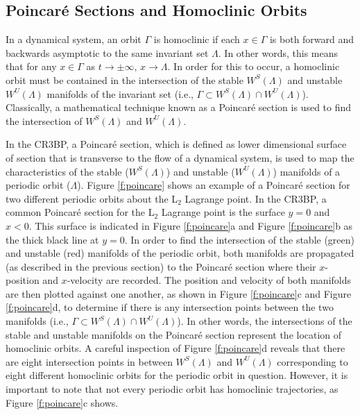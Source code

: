 \documentclass[11pt]{article} %
\begin{document}
\subsection{Poincar\'{e} Sections and Homoclinic Orbits}
In a dynamical system, an orbit $\Gamma$ is homoclinic if each $x\in\Gamma$ is both forward and backwards asymptotic to the same invariant set $\Lambda$. In other words, this means that for any $x\in\Gamma$ as $t\rightarrow\pm\infty$, $x\rightarrow\Lambda$. In order for this to occur, a homoclinic orbit must be contained in the intersection of the stable $W^S\left(\Lambda\right)$ and unstable $W^U\left(\Lambda\right)$ manifolds of the invariant set (i.e., $\Gamma\subset W^S\left(\Lambda\right)\cap W^U\left(\Lambda\right)$). Classically, a mathematical technique known as a Poincar\'{e} section is used to find the intersection of $W^S\left(\Lambda\right)$ and $W^U\left(\Lambda\right)$. 

In the CR3BP, a Poincar\'{e} section, which is defined as lower dimensional surface of section that is transverse to the flow of a dynamical system, is used to map the characteristics of the stable ($W^S\left(\Lambda\right)$) and unstable ($W^U\left(\Lambda\right)$) manifolds of a periodic orbit ($\Lambda$). Figure \ref{f:poincare} shows an example of a Poincar\'{e} section for two different periodic orbits about the L$_2$ Lagrange point. In the CR3BP, a common Poincar\'{e} section for the L$_2$ Lagrange point is the surface $y=0$ and $x<0$. This surface is indicated in Figure \ref{f:poincare}a and Figure \ref{f:poincare}b as the thick black line at $y=0$. In order to find the intersection of the stable (green) and unstable (red) manifolds of the periodic orbit, both manifolds are propagated (as described in the previous section) to the Poincar\'{e} section where their $x$-position and $x$-velocity are recorded. The position and velocity of both manifolds are then plotted against one another, as shown in Figure \ref{f:poincare}c and Figure \ref{f:poincare}d, to determine if there is any intersection points between the two manifolds (i.e., $\Gamma\subset W^S\left(\Lambda\right)\cap W^U\left(\Lambda\right)$). In other words, the intersections of the stable and unstable manifolds on the Poincar\'{e} section represent the location of homoclinic orbits. A careful inspection of Figure \ref{f:poincare}d reveals that there are eight intersection points in between $W^S\left(\Lambda\right)$ and $W^U\left(\Lambda\right)$ corresponding to eight different homoclinic orbits for the periodic orbit in question. However, it is important to note that not every periodic orbit has homoclinic trajectories, as Figure \ref{f:poincare}c shows. 
\end{document}
